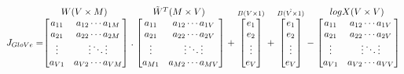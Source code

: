 \[J_{GloVe}=\stackrel{\mbox{$W(V\times M)$ }}{%
    \begin{bmatrix}
    a_{11} & a_{12}  \cdots  a_{1M} \\
    a_{21} & a_{22}  \cdots  a_{2M} \\
    \vdots & \vdots  \ddots  \vdots \\
    a_{V1} & a_{V2}  \cdots  a_{VM}
    \end{bmatrix}%
  } .
  \stackrel{\mbox{$\tilde{W}^T(M \times V)$ }}{%
    \begin{bmatrix}
    a_{11} & a_{12}  \cdots  a_{1V} \\
    a_{21} & a_{22}  \cdots  a_{2V} \\
    \vdots & \vdots  \ddots  \vdots \\
    a_{M1} & a_{M2}  \cdots  a_{MV}
    \end{bmatrix}%
  } +
  \stackrel{B( V \times 1)}{%
    \begin{bmatrix}
    e_1 \\
    e_2 \\
    \vdots \\
    e_V
    \end{bmatrix}%
   }
   +
  \stackrel{\tilde{B( V \times 1)}}{%
    \begin{bmatrix}
    e_1 \\
    e_2 \\
    \vdots \\
    e_V
    \end{bmatrix}%
   }-
   \stackrel{\mbox{$logX(V \times V)$ }}{%
    \begin{bmatrix}
    a_{11} & a_{12}  \cdots  a_{1V} \\
    a_{21} & a_{22}  \cdots  a_{2V} \\
    \vdots & \vdots  \ddots  \vdots \\
    a_{V1} & a_{V2}  \cdots  a_{VV}
    \end{bmatrix}%
  }
\]
\\
